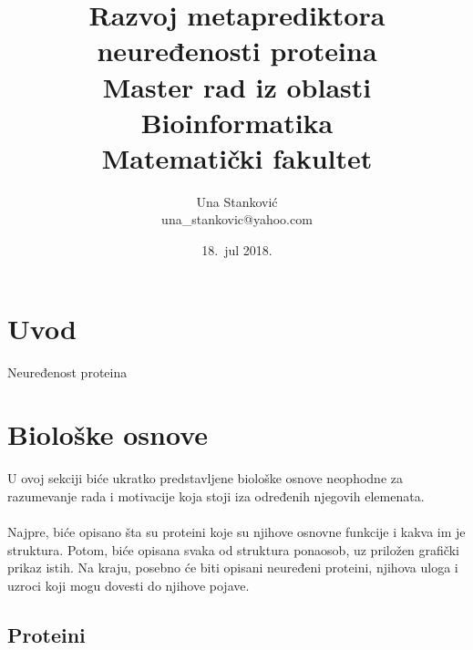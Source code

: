 \documentclass[a4paper]{article}
\begin{document}
\title{Razvoj metaprediktora neuređenosti proteina\\ \small{Master rad iz oblasti\\Bioinformatika\\ Matematički fakultet}}

\author{Una Stanković\\ una\_stankovic@yahoo.com}
\date{18.~jul 2018.}
\maketitle


\tableofcontents

\newpage

\section{Uvod}
\label{sec:uvod}
Neuređenost proteina 

\section{Biološke osnove}
\label{sec:prvi}
U ovoj sekciji biće ukratko predstavljene biološke osnove neophodne za razumevanje rada i motivacije koja stoji iza određenih njegovih elemenata.\\\\
Najpre, biće opisano šta su proteini koje su njihove osnovne funkcije i kakva im je struktura. Potom, biće opisana svaka od struktura ponaosob, uz priložen grafički prikaz istih. Na kraju, posebno će biti opisani neuređeni proteini, njihova uloga i uzroci koji mogu dovesti do njihove pojave. 

\subsection{Proteini}
\label{sec:proteini}
\end{document}
